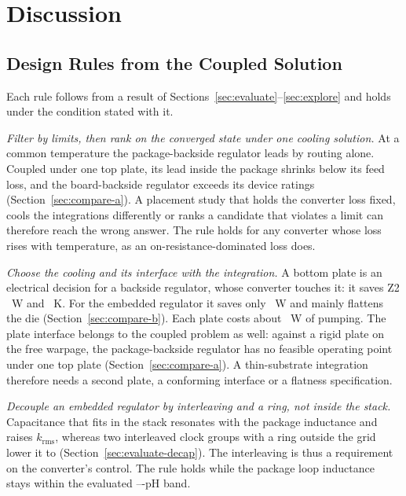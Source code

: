 \section{Discussion}\label{sec:discussion}

\subsection{Design Rules from the Coupled Solution}\label{sec:rules}
Each rule follows from a result of Sections~\ref{sec:evaluate}--\ref{sec:explore} and holds under
the condition stated with it.

\emph{Filter by limits, then rank on the converged state under one cooling solution.} At a common
temperature the package-backside regulator leads by routing alone. Coupled under one top plate,
its lead inside the package shrinks below its feed loss, and the board-backside regulator exceeds
its device ratings (Section~\ref{sec:compare-a}). A placement study that holds the converter loss
fixed, cools the integrations differently or ranks a candidate that violates a limit can therefore
reach the wrong answer. The rule holds for any converter whose loss rises with temperature, as an
on-resistance-dominated loss does.

\emph{Choose the cooling and its interface with the integration.} A bottom plate is an electrical
decision for a backside regulator, whose converter touches it: it saves Z2 \GainBZtwo~W and
\CoolBZtwo~K. For the embedded regulator it saves only \GainBZone~W and mainly flattens the die
(Section~\ref{sec:compare-b}). Each plate costs about \PumpShaftPlate~W of pumping. The plate
interface belongs to the coupled problem as well: against a rigid plate on the free warpage, the
package-backside regulator has no feasible operating point under one top plate
(Section~\ref{sec:compare-a}). A thin-substrate integration therefore needs a second plate, a
conforming interface or a flatness specification.

\emph{Decouple an embedded regulator by interleaving and a ring, not inside the stack.} Capacitance
that fits in the stack resonates with the package inductance and raises $k_{\mathrm{rms}}$, whereas
two interleaved clock groups with a ring outside the grid lower it to \WrKrms{}
(Section~\ref{sec:evaluate-decap}). The interleaving is thus a requirement on the converter's
control. The rule holds while the package loop inductance stays within the evaluated
\WrLloopLo--\WrLloopHi-pH band.

